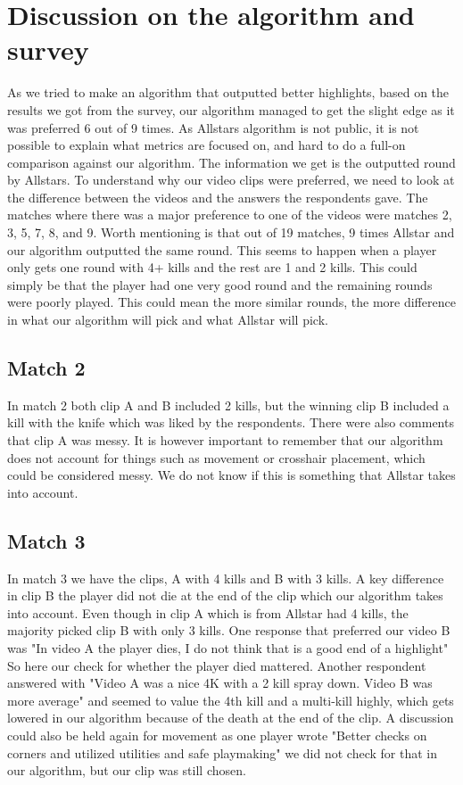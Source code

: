 \section{Discussion on the algorithm and survey}
As we tried to make an algorithm that outputted better highlights, based on the results we got from the survey, our algorithm managed to get the slight edge as it was preferred 6 out of 9 times. As Allstars algorithm is not public, it is not possible to explain what metrics are focused on, and hard to do a full-on comparison against our algorithm. The information we get is the outputted round by Allstars. To understand why our video clips were preferred, we need to look at the difference between the videos and the answers the respondents gave. The matches where there was a major preference to one of the videos were matches 2, 3, 5, 7, 8, and 9. Worth mentioning is that out of 19 matches, 9 times Allstar and our algorithm outputted the same round. This seems to happen when a player only gets one round with 4+ kills and the rest are 1 and 2 kills. This could simply be that the player had one very good round and the remaining rounds were poorly played. This could mean the more similar rounds, the more difference in what our algorithm will pick and what Allstar will pick. 
\subsection*{Match 2}
In match 2 both clip A and B included 2 kills, but the winning clip B included a kill with the knife which was liked by the respondents. There were also comments that clip A was messy. It is however important to remember that our algorithm does not account for things such as movement or crosshair placement, which could be considered messy. We do not know if this is something that Allstar takes into account.
\subsection*{Match 3}
In match 3 we have the clips, A with 4 kills and B with 3 kills. A key difference in clip B the player did not die at the end of the clip which our algorithm takes into account. Even though in clip A which is from Allstar had 4 kills, the majority picked clip B with only 3 kills. One response that preferred our video B was "In video A the player dies, I do not think that is a good end of a highlight" So here our check for whether the player died mattered. Another respondent answered with "Video A was a nice 4K with a 2 kill spray down. Video B was more average" and seemed to value the 4th kill and a multi-kill highly, which gets lowered in our algorithm because of the death at the end of the clip. A discussion could also be held again for movement as one player wrote "Better checks on corners and utilized utilities and safe playmaking" we did not check for that in our algorithm, but our clip was still chosen.
